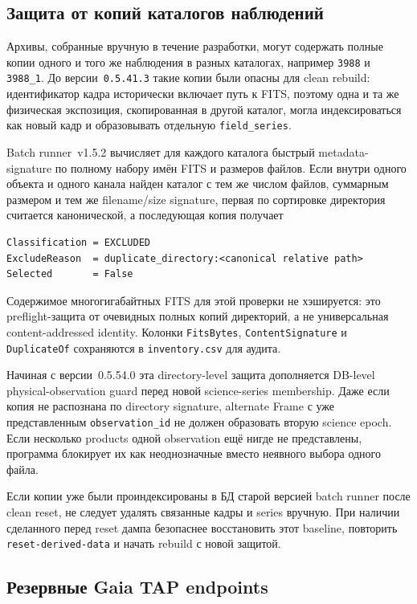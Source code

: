 \subsection{Защита от копий каталогов наблюдений}

Архивы, собранные вручную в течение разработки, могут содержать полные копии одного и того же наблюдения в разных каталогах, например \texttt{3988} и \texttt{3988\_1}. До версии~\texttt{0.5.41.3} такие копии были опасны для clean rebuild: идентификатор кадра исторически включает путь к FITS, поэтому одна и та же физическая экспозиция, скопированная в другой каталог, могла индексироваться как новый кадр и образовывать отдельную \texttt{field\_series}.

Batch runner~v1.5.2 вычисляет для каждого каталога быстрый metadata-signature по полному набору имён FITS и размеров файлов. Если внутри одного объекта и одного канала найден каталог с тем же числом файлов, суммарным размером и тем же filename/size signature, первая по сортировке директория считается канонической, а последующая копия получает

\begin{lstlisting}
Classification = EXCLUDED
ExcludeReason  = duplicate_directory:<canonical relative path>
Selected       = False
\end{lstlisting}

Содержимое многогигабайтных FITS для этой проверки не хэшируется: это preflight-защита от очевидных полных копий директорий, а не универсальная content-addressed identity. Колонки \texttt{FitsBytes}, \texttt{ContentSignature} и \texttt{DuplicateOf} сохраняются в \texttt{inventory.csv} для аудита.

Начиная с версии~0.5.54.0 эта directory-level защита дополняется DB-level physical-observation guard перед новой science-series membership. Даже если копия не распознана по directory signature, alternate Frame с уже представленным \texttt{observation\_id} не должен образовать вторую science epoch. Если несколько products одной observation ещё нигде не представлены, программа блокирует их как неоднозначные вместо неявного выбора одного файла.

Если копии уже были проиндексированы в БД старой версией batch runner после clean reset, не следует удалять связанные кадры и series вручную. При наличии сделанного перед reset дампа безопаснее восстановить этот baseline, повторить \texttt{reset-derived-data} и начать rebuild с новой защитой.

\subsection{Резервные Gaia TAP endpoints}

